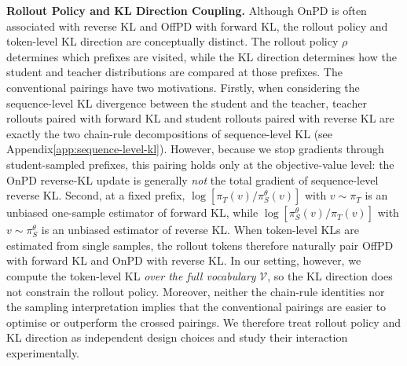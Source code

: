\documentclass{article} %
\theoremstyle{plain}
\theoremstyle{definition}
\theoremstyle{remark}
\begin{document}
\textbf{Rollout Policy and KL Direction Coupling.} Although OnPD is often associated with reverse KL and OffPD with forward KL, the rollout policy and token-level KL direction are conceptually distinct. The rollout policy $\rho$ determines which prefixes are visited, while the KL direction determines how the student and teacher distributions are compared at those prefixes. The conventional pairings have two motivations.
Firstly, when considering the sequence-level KL divergence between the student and the teacher, teacher rollouts paired with forward KL and student rollouts paired with reverse KL are exactly the two chain-rule decompositions of sequence-level KL (see Appendix\ref{app:sequence-level-kl}). However, because we stop gradients through student-sampled prefixes, this pairing holds only at the objective-value level: the OnPD reverse-KL update is generally \textit{not} the total gradient of sequence-level reverse KL. Second, at a fixed prefix, $\log[\pi_T(v)/\pi_S^\theta(v)]$ with $v\sim\pi_T$ is an unbiased one-sample estimator of forward KL, while $\log[\pi_S^\theta(v)/\pi_T(v)]$ with $v\sim\pi_S^\theta$ is an unbiased estimator of reverse KL. When token-level KLs are estimated from single samples, the rollout tokens therefore naturally pair OffPD with forward KL and OnPD with reverse KL. In our setting, however, we compute the token-level KL \textit{over the full vocabulary} $\mathcal{V}$, so the KL direction does not constrain the rollout policy.  Moreover, neither the chain-rule identities nor the sampling interpretation implies that the conventional pairings are easier to optimise or outperform the crossed pairings. We therefore treat rollout policy and KL direction as independent design choices and study their interaction experimentally.
\end{document}
